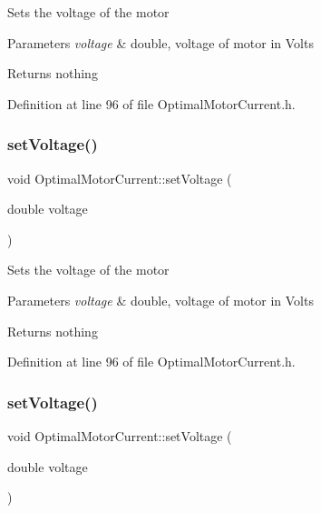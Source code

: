 Sets the voltage of the motor


\begin{DoxyParams}{Parameters}
{\em voltage} & double, voltage of motor in Volts\\
\hline
\end{DoxyParams}
\begin{DoxyReturn}{Returns}
nothing 
\end{DoxyReturn}


Definition at line 96 of file Optimal\+Motor\+Current.\+h.

\mbox{\label{class_optimal_motor_current_a71dd261541b67b551e7053d3d6a35f6d}} 
\subsubsection{\texorpdfstring{set\+Voltage()}{setVoltage()}\hspace{0.1cm}{\footnotesize\ttfamily [2/3]}}
{\footnotesize\ttfamily void Optimal\+Motor\+Current\+::set\+Voltage (\begin{DoxyParamCaption}\item[{double}]{voltage }\end{DoxyParamCaption})\hspace{0.3cm}{\ttfamily [inline]}}

Sets the voltage of the motor


\begin{DoxyParams}{Parameters}
{\em voltage} & double, voltage of motor in Volts\\
\hline
\end{DoxyParams}
\begin{DoxyReturn}{Returns}
nothing 
\end{DoxyReturn}


Definition at line 96 of file Optimal\+Motor\+Current.\+h.

\mbox{\label{class_optimal_motor_current_a71dd261541b67b551e7053d3d6a35f6d}} 
\subsubsection{\texorpdfstring{set\+Voltage()}{setVoltage()}\hspace{0.1cm}{\footnotesize\ttfamily [3/3]}}
{\footnotesize\ttfamily void Optimal\+Motor\+Current\+::set\+Voltage (\begin{DoxyParamCaption}\item[{double}]{voltage }\end{DoxyParamCaption})\hspace{0.3cm}{\ttfamily [inline]}}

